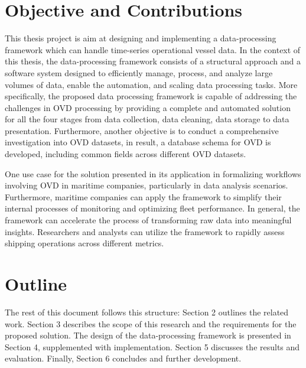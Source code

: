 \section{Objective and Contributions}
This thesis project is aim at designing and implementing a data-processing framework which can handle time-series operational vessel data.
In the context of this thesis, the data-processing framework consists of a structural approach and a software system designed to efficiently manage, process, and analyze large volumes of data, enable the automation, and scaling data processing tasks.
More specifically, the proposed data processing framework is capable of addressing the challenges in OVD processing by providing a complete and automated solution for all the four stages from data collection, data cleaning, data storage to data presentation.
Furthermore, another objective is to conduct a comprehensive investigation into OVD datasets, in result, a database schema for OVD is developed, including common fields across different OVD datasets.


One use case for the solution presented in its application in formalizing workflows involving OVD in maritime companies, particularly in data analysis scenarios. 
Furthermore, maritime companies can apply the framework to simplify their internal processes of monitoring and optimizing fleet performance. 
In general, the framework can accelerate the process of transforming raw data into meaningful insights. Researchers and analysts can utilize the framework to rapidly assess shipping operations across different metrics. 

\section{Outline}

The rest of this document follows this structure: Section 2 outlines the related work. Section 3 describes the scope of this research and the requirements for the proposed solution. The design of the data-processing framework is presented in Section 4, supplemented with implementation. Section 5 discusses the results and evaluation. Finally, Section 6 concludes and further development.